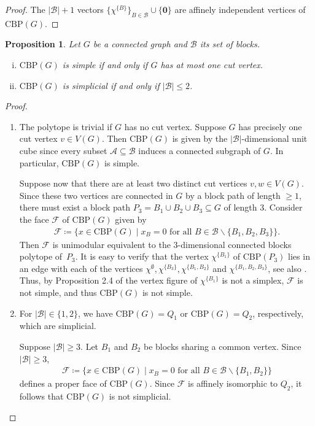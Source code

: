 \documentclass[12pt]{amsart}
\newtheorem{proposition}[theorem]{Proposition}
\newcommand{\CBP}{\mathrm{CBP}}
\newcommand{\B}{\mathcal{B}}
\newcommand{\A}{\mathcal{A}}
\newcommand{\F}{\mathcal{F}}
\begin{document}
\begin{proof}
    The $\vert \B \vert +1$ vectors $\{\chi^{\{B\}}\}_{B \in \B} \cup \{\mathbf{0}\}$ are affinely independent vertices of $\CBP(G)$.
\end{proof}

\begin{proposition}
    \label{propsimplesimplicial}
    Let $G$ be a connected graph and $\B$ its set of blocks.
    \begin{enumerate}[(i)]
        \item $\CBP(G)$ is simple if and only if $G$ has at most one cut vertex.
        \item $\CBP(G)$ is simplicial if and only if $\vert \B \vert \le 2$.
    \end{enumerate}
    
\end{proposition}

\begin{proof}
    \begin{enumerate}[$(i)$]
        \item The polytope is trivial if $G$ has no cut vertex. Suppose $G$ has precisely one cut vertex $v \in V(G)$. Then $\CBP(G)$ is given by the $\vert \B \vert$-dimensional unit cube since every subset $\A \subseteq \B$ induces a connected subgraph of $G$. In particular, $\CBP(G)$ is simple.
    
        Suppose now that there are at least two distinct cut vertices $v,w \in V(G)$. Since these two vertices are connected in $G$ by a block path of length $\ge 1$, there must exist a block path $P_3=B_1 \cup B_2 \cup B_3 \subseteq G$ of length $3$. Consider the face $\F$ of $\CBP(G)$ given by 
        \begin{align*}
            \F \coloneqq \{ x\in \CBP(G) \mid x_B=0 \text{ for all } B \in \B \backslash \{B_1,B_2,B_3\}\}.
        \end{align*}
        Then $\F$ is unimodular equivalent to the $3$-dimensional connected blocks polytope of~$P_3$. It is easy to verify that the vertex $\chi^{\{B_1\}}$ of $\CBP(P_3)$ lies in an edge with each of the vertices $\chi^\emptyset, \chi^{\{B_3\}}, \chi^{\{B_1,B_2\}}$ and $\chi^{\{B_1,B_2,B_3\}}$, see also . Thus, by Proposition 2.4 of \cite{Ziegler} the vertex figure of $\chi^{\{B_1\}}$ is not a simplex, $\F$ is not simple, and thus $\CBP(G)$ is not simple.
        
        \item For $\vert \B \vert \in \{1,2\}$, we have $\CBP(G)=Q_1$ or $\CBP(G)=Q_2$, respectively, which are simplicial.
        
        Suppose $\vert \B \vert \ge 3$. Let $B_1$ and $B_2$ be blocks sharing a common vertex. Since $\vert \B \vert \ge 3$,
            \begin{align*}
                \F \coloneqq \{x \in \CBP(G) \mid x_B=0 \text{ for all } B \in \B \backslash \{B_1,B_2\} \}
          \end{align*}
        defines a proper face of $\CBP(G)$. Since $\F$ is affinely isomorphic to $Q_2$, it follows that $\CBP(G)$ is not simplicial. \qedhere
    \end{enumerate}
    \end{proof}
\end{document}
